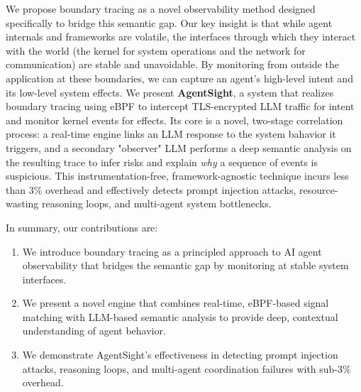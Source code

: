 We propose {boundary tracing} as a novel observability method designed specifically to bridge this semantic gap. Our key insight is that while agent internals and frameworks are volatile, the interfaces through which they interact with the world (the kernel for system operations and the network for communication) are stable and unavoidable. By monitoring from outside the application at these boundaries, we can capture an agent's high-level intent and its low-level system effects. We present \textbf{AgentSight}, a system that realizes boundary tracing using eBPF to intercept TLS-encrypted LLM traffic for intent and monitor kernel events for effects. Its core is a novel, two-stage correlation process: a real-time engine links an LLM response to the system bahavior it triggers, and a secondary "observer" LLM performs a deep semantic analysis on the resulting trace to infer risks and explain \emph{why} a sequence of events is suspicious. This instrumentation-free, framework-agnostic technique incurs less than 3\% overhead and effectively detects prompt injection attacks, resource-wasting reasoning loops, and multi-agent system bottlenecks.

In summary, our contributions are:

\begin{enumerate}
\item We introduce boundary tracing as a principled approach to AI agent observability that bridges the semantic gap by monitoring at stable system interfaces.
\item We present a novel engine that combines real-time, eBPF-based signal matching with LLM-based semantic analysis to provide deep, contextual understanding of agent behavior.
\item We demonstrate AgentSight's effectiveness in detecting prompt injection attacks, reasoning loops, and multi-agent coordination failures with sub-3\% overhead.
\end{enumerate}


